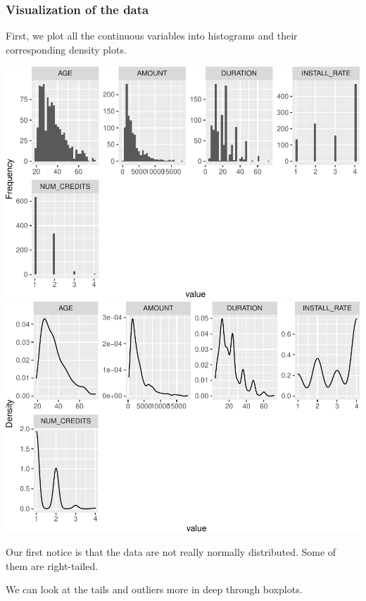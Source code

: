 \documentclass[
]{article}
\begin{document}
\hypertarget{visualization-of-the-data}{%
\subsubsection{Visualization of the
data}\label{visualization-of-the-data}}

First, we plot all the continuous variables into histograms and their
corresponding density plots.

\begin{center}\includegraphics{report_files/figure-latex/unnamed-chunk-9-1} \includegraphics{report_files/figure-latex/unnamed-chunk-9-2} \end{center}

Our first notice is that the data are not really normally distributed.
Some of them are right-tailed.

We can look at the tails and outliers more in deep through boxplots.
\end{document}
